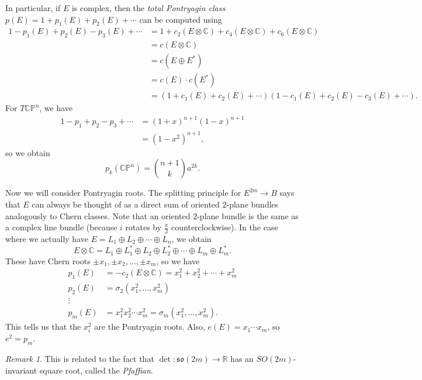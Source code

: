\documentclass[leqno, openany]{memoir}
\theoremstyle{definition}
\theoremstyle{remark}
\newtheorem{rmk}[thm]{Remark}
\theoremstyle{plain}
\theoremstyle{definition}
\theoremstyle{remark}
\newcommand{\R}{\mathbb{R}}
\newcommand{\C}{\mathbb{C}}
\renewcommand{\P}{\mathbb{P}}
\newcommand{\mf}[1]{\mathfrak{#1}}
\begin{document}
In particular, if $E$ is complex, then the \textit{total Pontryagin class} $p(E) = 1 + p_1(E) + p_2(E) + \cdots$ can be computed using
\begin{align*}
    1 - p_1(E) + p_2(E) - p_3(E) + \cdots &= 1 + c_2(E \otimes \C) + c_4(E \otimes \C) + c_6(E \otimes \C) \\
                                          &= c(E \otimes \C) \\
                                          &= c(E \oplus E^*) \\
                                          &= c(E) \cdot c(E^*) \\
                                          &= (1 + c_1(E) + c_2(E) + \cdots) (1-c_1(E) + c_2(E) - c_3(E) + \cdots).
\end{align*}
For $T\C\P^n$, we have
\begin{align*}
    1 - p_1 + p_2 - p_3 + \cdots &= {(1+x)}^{n+1} {(1-x)}^{n+1} \\
                                 &= {(1-x^2)}^{n+1},
\end{align*}
so we obtain
\[ p_k(\C\P^n) = \binom{n+1}{k} a^{2k}. \]

Now we will consider Pontryagin roots. The splitting principle for $E^{2m} \to B$ says that $E$ can always be thought of as a direct sum of oriented $2$-plane bundles analogously to Chern classes. Note that an oriented $2$-plane bundle is the same as a complex line bundle (because $i$ rotates by $\frac{\pi}{2}$ counterclockwise). In the case where we actually have $E = L_1 \oplus L_2 \oplus \cdots \oplus L_n$, we obtain
\[ E \otimes \C = L_1 \oplus L_1^* \oplus L_2 \oplus L_2^* \oplus \cdots \oplus L_m \oplus L_m^*. \]
These have Chern roots $\pm x_1, \pm x_2, \ldots, \pm x_m$, so we have
\begin{align*} 
    p_1(E) &= -c_2(E \otimes \C) = x_1^2 + x_2^2 + \cdots + x_m^2 \\
    p_2(E) &= \sigma_2(x_1^2, \ldots, x_m^2) \\
    \vdots & \\
    p_m(E) &= x_1^2 x_2^2 \cdots x_m^2 = \sigma_m(x_1^2, \ldots, x_m^2).
\end{align*}
This tells us that the $x_i^2$ are the Pontryagin roots. Also, $e(E) = x_1 \cdots x_m$, so $e^2 = p_m$.

\begin{rmk}
    This is related to the fact that $\det \colon \mf{so}(2m) \to \R$ has an $SO(2m)$-invariant square root, called the \textit{Pfaffian}.
\end{rmk}
\end{document}
